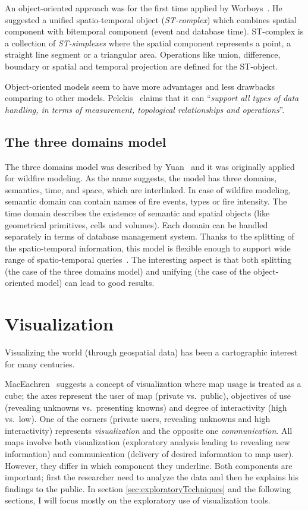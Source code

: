 \documentclass[a4paper,12pt,oneside]{book}
\begin{document}
An object-oriented approach was for the first time applied by Worboys~\cite{worboys1994unified}.
He suggested a unified spatio-temporal object (\emph{ST-complex}) which combines spatial component
with bitemporal component (event and database time). ST-complex is a collection of \emph{ST-simplexes}
where the spatial component represents a point, a straight line segment or a triangular area.
Operations like union, difference, boundary or spatial and temporal projection are defined for the ST-object.

Object-oriented models seem to have more advantages and less drawbacks comparing to other models.
Pelekis~\cite[p.~27]{pelekis2004} claims that it can ``\emph{support  all types of data handling,
in terms of measurement, topological relationships and operations}''.

\subsection{The three domains model}
The three domains model was described by Yuan~\cite{yuan1994wildfire}
and it was originally applied for wildfire modeling.
As the name suggests, the model has three domains, semantics, time, and space, which are interlinked.
In case of wildfire modeling, semantic domain can contain names of fire events, types or fire intensity.
The time domain describes the existence of semantic and spatial objects
(like geometrical primitives, cells and volumes).
Each domain can be handled separately in terms of database management system.
Thanks to the splitting of the spatio-temporal information,
this model is flexible enough to support wide range of spatio-temporal queries~\cite{pelekis2004}.
The interesting aspect is that both splitting (the case of the three domains model)
and unifying (the case of the object-oriented model) can lead to good results.


\section{Visualization}
\label{sec:visualization}
Visualizing the world (through geospatial data) has been a cartographic interest for many centuries.


MacEachren~\cite{maceachren1997exploratory} suggests a concept of visualization
where map usage is treated as a cube;
the axes represent the user of map (private vs.\ public),
objectives of use (revealing unknowns vs.\ presenting knowns)
and degree of interactivity (high vs.\ low).
One of the corners (private users, revealing unknowns and high interactivity)
represents \emph{visualization} and the opposite one \emph{communication}.
All maps involve both visualization (exploratory analysis leading to revealing new information)
and communication (delivery of desired information to map user).
However, they differ in which component they underline.
Both components are important; first the researcher need to analyze the data
and then he explains his findings to the public.
In section \ref{sec:exploratoryTechniques} and the following sections,
I will focus mostly on the exploratory use of visualization tools.
\end{document}
